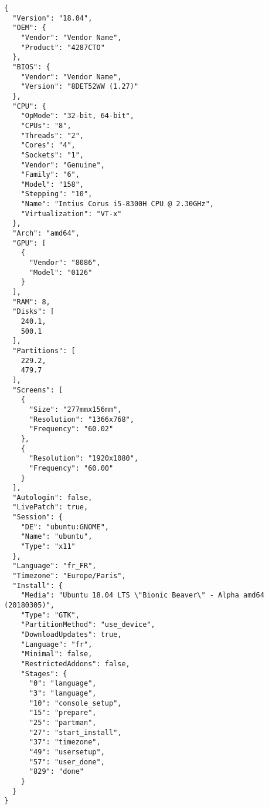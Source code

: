 \begin{lstlisting}[label=lst:ubuntu-report, caption=Example report for an Ubuntu X86\_64 System\cite{roche_ubuntuubuntu-report_2020}]
{
  "Version": "18.04",
  "OEM": {
    "Vendor": "Vendor Name",
    "Product": "4287CTO"
  },
  "BIOS": {
    "Vendor": "Vendor Name",
    "Version": "8DET52WW (1.27)"
  },
  "CPU": {
    "OpMode": "32-bit, 64-bit",
    "CPUs": "8",
    "Threads": "2",
    "Cores": "4",
    "Sockets": "1",
    "Vendor": "Genuine",
    "Family": "6",
    "Model": "158",
    "Stepping": "10",
    "Name": "Intius Corus i5-8300H CPU @ 2.30GHz",
    "Virtualization": "VT-x"
  },
  "Arch": "amd64",
  "GPU": [
    {
      "Vendor": "8086",
      "Model": "0126"
    }
  ],
  "RAM": 8,
  "Disks": [
    240.1,
    500.1
  ],
  "Partitions": [
    229.2,
    479.7
  ],
  "Screens": [
    {
      "Size": "277mmx156mm",
      "Resolution": "1366x768",
      "Frequency": "60.02"
    },
    {
      "Resolution": "1920x1080",
      "Frequency": "60.00"
    }
  ],
  "Autologin": false,
  "LivePatch": true,
  "Session": {
    "DE": "ubuntu:GNOME",
    "Name": "ubuntu",
    "Type": "x11"
  },
  "Language": "fr_FR",
  "Timezone": "Europe/Paris",
  "Install": {
    "Media": "Ubuntu 18.04 LTS \"Bionic Beaver\" - Alpha amd64 (20180305)",
    "Type": "GTK",
    "PartitionMethod": "use_device",
    "DownloadUpdates": true,
    "Language": "fr",
    "Minimal": false,
    "RestrictedAddons": false,
    "Stages": {
      "0": "language",
      "3": "language",
      "10": "console_setup",
      "15": "prepare",
      "25": "partman",
      "27": "start_install",
      "37": "timezone",
      "49": "usersetup",
      "57": "user_done",
      "829": "done"
    }
  }
}
\end{lstlisting}